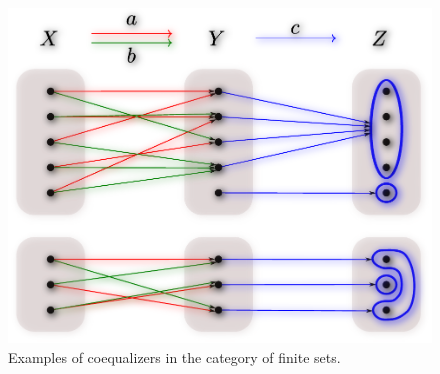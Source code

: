 \begin{frame}
\begin{figure}
\noindent\includegraphics[width=0.8\framewidth]{fig/coequalizer.pdf}
\caption{Examples of coequalizers in the category of finite sets.}
\label{fig:coequalizer}
\end{figure}
\end{frame}